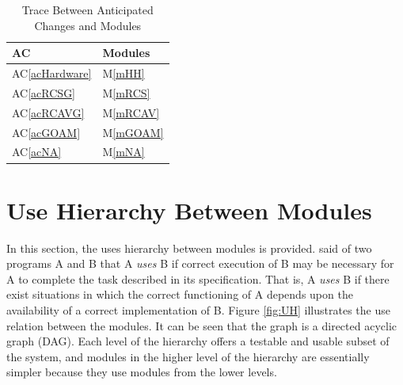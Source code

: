 \documentclass[12pt, titlepage]{article}
\newcommand{\acref}[1]{AC\ref{#1}}
\newcommand{\mref}[1]{M\ref{#1}}
\begin{document}
\begin{table}[H]
\centering
\begin{tabular}{p{} p{}}
\toprule
\textbf{AC} & \textbf{Modules}\\
\midrule
\acref{acHardware} & \mref{mHH}\\
\acref{acRCSG} & \mref{mRCS}\\
\acref{acRCAVG} & \mref{mRCAV}\\
\acref{acGOAM} & \mref{mGOAM}\\
\acref{acNA} & \mref{mNA}\\
\bottomrule
\end{tabular}
\caption{Trace Between Anticipated Changes and Modules}
\label{TblACT}
\end{table}

\section{Use Hierarchy Between Modules} \label{SecUse}

In this section, the uses hierarchy between modules is
provided. \citet{Parnas1978} said of two programs A and B that A {\em uses} B if
correct execution of B may be necessary for A to complete the task described in
its specification. That is, A {\em uses} B if there exist situations in which
the correct functioning of A depends upon the availability of a correct
implementation of B.  Figure \ref{fig:UH} illustrates the use relation between
the modules. It can be seen that the graph is a directed acyclic graph
(DAG). Each level of the hierarchy offers a testable and usable subset of the
system, and modules in the higher level of the hierarchy are essentially simpler
because they use modules from the lower levels.
\end{document}
